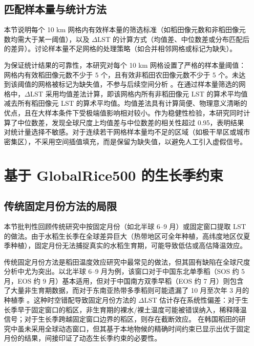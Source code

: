 \subsection{匹配样本量与统计方法}

本节说明每个 10 km 网格内有效样本量的筛选标准（如稻田像元数和非稻田像元数均需大于某一阈值），以及 $\Delta$LST 的计算方式（均值差、中位数差或分布匹配后的差异）。讨论样本量不足网格的处理策略（如合并相邻网格或标记为缺失）。

为保证统计结果的可靠性，本研究对每个 10 km 网格设置了严格的样本量阈值：网格内有效稻田像元数不少于 5 个，且有效非稻田农田像元数不少于 5 个。未达到该阈值的网格被标记为缺失值，不参与后续空间分析 \cite{Weng2025}。在通过样本量筛选的网格中，$\Delta$LST 采用均值差法计算，即该网格内所有非稻田像元 LST 的算术平均值减去所有稻田像元 LST 的算术平均值。均值差法具有计算简便、物理意义清晰的优点，且在大样本条件下受极端值影响相对较小。作为稳健性检验，本研究同时计算了中位数差，发现全球尺度上均值差与中位数差的相关性超过 0.95，表明结果对统计量选择不敏感。对于连续若干网格样本量均不足的区域（如极干旱区或城市密集区），不采用空间插值填充，而是保留为缺失值，以避免人工引入虚假信号。

\section{基于 GlobalRice500 的生长季约束}

\subsection{传统固定月份方法的局限}

本节批判性回顾传统研究中按固定月份（如北半球 6--9 月）或固定窗口提取 LST 的做法。由于水稻生长季在全球差异巨大（热带地区可全年种植，高纬度地区仅夏季种植），固定月份无法捕捉真实的水稻生育期，可能导致低估或高估降温效应。

传统固定月份方法是稻田温度效应研究中最常见的做法，但其固有缺陷在全球尺度分析中尤为突出。以北半球 6--9 月为例，该窗口对于中国东北单季稻（SOS 约 5 月，EOS 约 9 月）基本适用，但对于中国南方双季早稻（EOS 约 7 月）则包含了大量非生育期数据，而对于东南亚热带多季稻则可能遗漏了 10 月至次年 3 月的种植季 \cite{Dong2016}。这种时空错配导致固定月份方法的 $\Delta$LST 估计存在系统性偏差：对于生长季早于固定窗口的稻区，非生育期的裸水/裸土温度可能被错误纳入，稀释降温信号；对于生长季跨越固定窗口边界的稻区，则存在截断效应。\cite{Xue2021RemoteSensing} 在韩国稻田的研究中虽未采用全球动态窗口，但其基于本地物候的精确时间约束已显示出优于固定月份的结果，间接印证了动态生长季约束的必要性。

